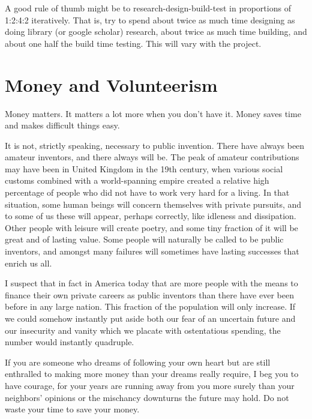 \documentclass[
	fontsize=10pt, %
	twoside=false, %
	secnumdepth=1, %
]{kaobook}
\begin{document}
A good rule of thumb might be to research-design-build-test
in proportions of 1:2:4:2 iteratively. That is,
try to spend about twice as much time designing as doing
library (or google scholar) research, about twice as much
time building, and about one half the build time testing.
This will vary with the project.


\chapter{Money and Volunteerism}

Money matters. It matters a lot more when you don't have it.
Money saves time and makes difficult things easy.

It is not, strictly speaking, necessary to public invention.
There have always been amateur inventors, and there always will be.
The peak of amateur contributions may have been in United Kingdom in the
19th century, when various social customs combined with a world-spanning
empire created a relative high percentage of people who did not have
to work very hard for a living. In that situation, some human beings
will concern themselves with private pursuits, and to some of us
these will appear, perhaps correctly, like idleness and dissipation.
Other people with leisure will create poetry,
and some tiny fraction of it will be great and of lasting value.
Some people will naturally be called to be public inventors, and
amongst many failures will sometimes have lasting successes
that enrich us all.

I suspect that in fact in America today that are more people
with the means to finance their own private careers as public inventors
than there have ever been before in any large nation.
This fraction of the population will
only increase. If we could somehow instantly put aside both our
fear of an uncertain future and our insecurity and vanity which
we placate with ostentatious spending, the number would instantly
quadruple.

If you are someone who dreams of following your own heart but
are still enthralled to making more money than your dreams really
require, I beg you to have courage, for your years are running
away from you more surely than your neighbors' opinions or the
mischancy downturns the future may hold. Do not waste your
time to save your money.
\end{document}

